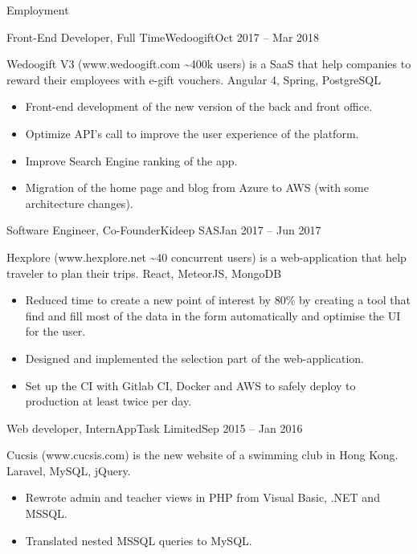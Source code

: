 \documentclass[]{mcdowellcv}
\begin{document}
	\makeheader
	
	\begin{cvsection}{Employment}
		\begin{cvsubsection}{Front-End Developer, Full Time}{Wedoogift}{Oct 2017 -- Mar 2018}
\raggedright Wedoogift V3 (www.wedoogift.com \sim 400k users)  is a SaaS that help companies to reward their employees with e-gift vouchers. Angular 4, Spring, PostgreSQL
			\begin{itemize}
				\item Front-end development of the new version of the back and front office.
				\item Optimize API’s call to improve the user experience of the platform.
				\item Improve Search Engine ranking of the app.
				\item Migration of the home page and blog from Azure to AWS (with some architecture changes).
			\end{itemize}
		\end{cvsubsection}
		\begin{cvsubsection}{Software Engineer, Co-Founder}{Kideep SAS}{Jan 2017 -- Jun 2017}
\raggedright Hexplore (www.hexplore.net \sim 40 concurrent users) is a web-application that help traveler to plan their trips. React, MeteorJS, MongoDB
			\begin{itemize}
				\item Reduced time to create a new point of interest by 80\% by creating a tool that find and fill most of the data in the form automatically and optimise the UI for the user.
				\item Designed and implemented the selection part of the web-application.
				\item Set up the CI with Gitlab CI, Docker and AWS to safely deploy to production at least twice per day.
			\end{itemize}
		\end{cvsubsection}
		
		\begin{cvsubsection}{Web developer, Intern}{AppTask Limited}{Sep 2015 -- Jan 2016}
\raggedright Cucsis (www.cucsis.com) is the new website of a swimming club in Hong Kong. \linebreak Laravel, MySQL, jQuery.		
			\begin{itemize}
				\item Rewrote admin and teacher views in PHP from Visual Basic, .NET and MSSQL.
				\item Translated nested MSSQL queries to MySQL.
			\end{itemize}
		\end{cvsubsection}
	\end{cvsection}
\end{document}

